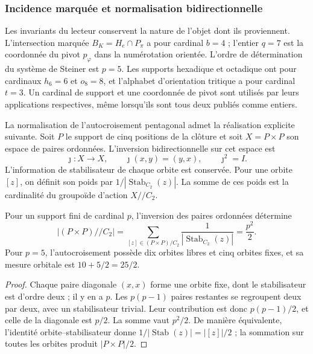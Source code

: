 \subsubsection{Incidence marquée et normalisation bidirectionnelle}
\label{sec:ii09-normalizacion-bidireccional}

Les invariants du lecteur conservent la nature de l'objet dont ils
proviennent. L'intersection marquée $B_K=H_e\cap P_\pi$ a pour cardinal
$b=4$ ; l'entier $q=7$ est la coordonnée du pivot $p_\varphi$ dans la
numérotation orientée. L'ordre de détermination du système de Steiner
est $p=5$. Les supports hexadique et octadique ont pour cardinaux $h_6=6$
et $o_8=8$, et l'alphabet d'orientation tritique a pour cardinal $t=3$.
Un cardinal de support et une coordonnée de pivot sont utilisés par
leurs applications respectives, même lorsqu'ils sont tous deux publiés comme entiers.

La normalisation de l'autocroisement pentagonal admet la
réalisation explicite suivante. Soit $P$ le support de cinq positions de la clôture
et soit $X=P\times P$ son espace de paires ordonnées. L'inversion
bidirectionnelle sur cet espace est
\[
 \jmath:X\longrightarrow X,\qquad \jmath(x,y)=(y,x),
 \qquad\jmath^2=I.
\]
L'information de stabilisateur de chaque orbite est conservée. Pour une
orbite $[z]$, on définit son poids par
$1/|\operatorname{Stab}_{C_2}(z)|$. La somme de ces poids est la
cardinalité du groupoïde d'action $X/\!/C_2$.

\begin{proposition}
\label{prop:ii09-semicuadrado-orbital}
Pour un support fini de cardinal $p$, l'inversion des paires ordonnées
détermine
\[
 |(P\times P)/\!/C_2|
 =\sum_{[z]\in(P\times P)/C_2}
      \frac1{|\operatorname{Stab}_{C_2}(z)|}
 =\frac{p^2}{2}.
\]
Pour $p=5$, l'autocroisement possède dix orbites libres et cinq orbites
fixes, et sa mesure orbitale est $10+5/2=25/2$.
\end{proposition}
\begin{proof}
Chaque paire diagonale $(x,x)$ forme une orbite fixe, dont le stabilisateur
est d'ordre deux ; il y en a $p$. Les $p(p-1)$ paires restantes se
regroupent deux par deux, avec un stabilisateur trivial. Leur contribution est
donc $p(p-1)/2$, et celle de la diagonale est $p/2$. La somme vaut
$p^2/2$. De manière équivalente, l'identité orbite--stabilisateur donne
$1/|\operatorname{Stab}(z)|=|[z]|/2$ ; la sommation sur toutes les orbites
produit $|P\times P|/2$.
\end{proof}

